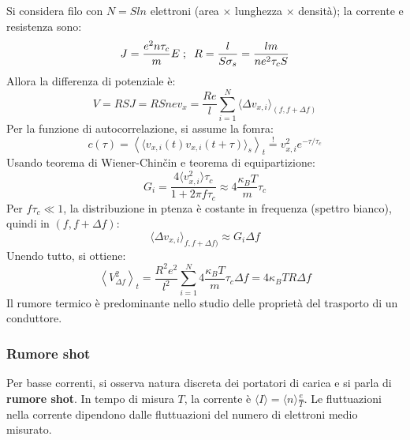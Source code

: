 \documentclass[10pt, a4paper]{scrartcl}
\numberwithin{equation}{subsection}
\theoremstyle{style1}
\theoremstyle{style2}
\begin{document}
Si considera filo con $N = S l n$ elettroni (area $\times $ lunghezza $\times $ densit\`a); la corrente e resistenza sono:
\[
	J = \frac{e^2 n \tau _c }{m}E \hspace{.1cm} ; \hspace{.2cm} R = \frac{l}{S\sigma _s} = \frac{lm}{ne^2 \tau _c S}
\] 
Allora la differenza di potenziale \`e:
\[
V = RSJ = RSnev_x = \frac{Re}{l} \sum_{i=1}^{N} \langle \Delta v_{x,i}  \rangle_{(f,f+\Delta f)} 
\] 
Per la funzione di autocorrelazione, si assume la fomra:
\[
c(\tau ) = \left\langle \langle v_{x,i} (t) v_{x,i} (t+\tau ) \rangle_s \right\rangle_t \stackrel{!}{=} v_{x,i} ^2 e^{ - \tau  / \tau _c} 
\] 
Usando teorema di Wiener-Chin\v cin e teorema di equipartizione:
\begin{equation}
	G_i = \frac{4 \langle v_{x,i} ^2 \rangle\tau _c}{1+ 2 \pi f \tau _c} \approx 4 \frac{\kappa _B T}{m}\tau _c
\end{equation}
Per $f\tau _c \ll 1$, la distribuzione in ptenza \`e costante in frequenza (spettro bianco), quindi in $(f,f+\Delta f)$:
\[
\langle \Delta v_{x,i}  \rangle_{f,f+\Delta f)} \approx G_i \Delta f
\] 
Unendo tutto, si ottiene:
\begin{equation}
	\left\langle V^2_{\Delta f}  \right\rangle_t = \frac{R^2 e^2}{l^2} \sum_{i=1}^{N} 4 \frac{\kappa _B T}{m}\tau_c \Delta f = 4 \kappa _B T R \Delta f
\end{equation}
Il rumore termico \`e predominante nello studio delle propriet\`a del trasporto di un conduttore.

\subsubsection{Rumore shot}

Per basse correnti, si osserva natura discreta dei portatori di carica e si parla di \textbf{rumore shot}. 
In tempo di misura $T$, la corrente \`e $\langle I \rangle = \langle n \rangle \frac{e}{T}$.
Le fluttuazioni nella corrente dipendono dalle fluttuazioni del numero di elettroni medio misurato.
\end{document}
